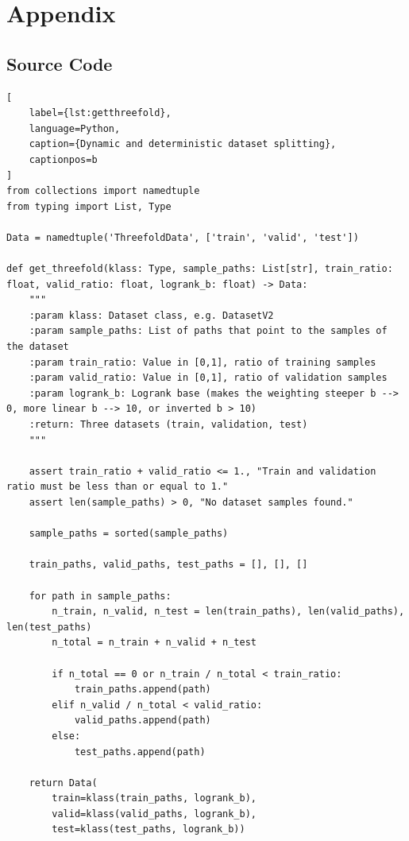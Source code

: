\clearpage
\appendix

\section{Appendix}

\clearpage

\clearpage

\subsection{Source Code}

\begin{lstlisting}[
    label={lst:getthreefold},
    language=Python,
    caption={Dynamic and deterministic dataset splitting},
    captionpos=b
]
from collections import namedtuple
from typing import List, Type

Data = namedtuple('ThreefoldData', ['train', 'valid', 'test'])

def get_threefold(klass: Type, sample_paths: List[str], train_ratio: float, valid_ratio: float, logrank_b: float) -> Data:
    """
    :param klass: Dataset class, e.g. DatasetV2
    :param sample_paths: List of paths that point to the samples of the dataset
    :param train_ratio: Value in [0,1], ratio of training samples
    :param valid_ratio: Value in [0,1], ratio of validation samples
    :param logrank_b: Logrank base (makes the weighting steeper b --> 0, more linear b --> 10, or inverted b > 10)
    :return: Three datasets (train, validation, test)
    """

    assert train_ratio + valid_ratio <= 1., "Train and validation ratio must be less than or equal to 1."
    assert len(sample_paths) > 0, "No dataset samples found."

    sample_paths = sorted(sample_paths)

    train_paths, valid_paths, test_paths = [], [], []

    for path in sample_paths:
        n_train, n_valid, n_test = len(train_paths), len(valid_paths), len(test_paths)
        n_total = n_train + n_valid + n_test

        if n_total == 0 or n_train / n_total < train_ratio:
            train_paths.append(path)
        elif n_valid / n_total < valid_ratio:
            valid_paths.append(path)
        else:
            test_paths.append(path)

    return Data(
        train=klass(train_paths, logrank_b),
        valid=klass(valid_paths, logrank_b),
        test=klass(test_paths, logrank_b))
\end{lstlisting}
\clearpage

